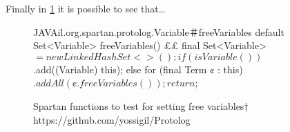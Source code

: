 Finally in \cref{figure:shock-3} it is possible to see that…


\begin{figure}[ht]
    \caption{%
      Spartan functions to test for setting free variables†{
      https://github.com/yossigil/Protolog
      }
    }
\label{figure:shock-3}
\begin{Code}{JAVA}{il.org.spartan.protolog.Variable＃freeVariables}
default Set<Variable> freeVariables() {££
    final Set<Variable> $ = new LinkedHashSet<>();
    if (isVariable())
     $.add((Variable) this);
    else
      for (final Term ¢ : this)
       $.addAll(¢.freeVariables());
    return $;
  }
\end{Code}
\end{figure}
